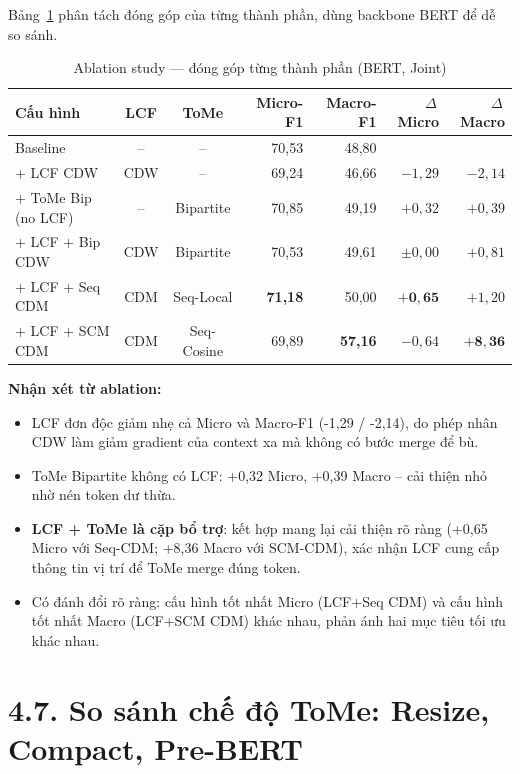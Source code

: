 Bảng~\ref{tab:ablation} phân tách đóng góp của từng thành phần,
dùng backbone BERT để dễ so sánh.

\begin{table}[H]
\centering
\small
\caption{Ablation study — đóng góp từng thành phần (BERT, Joint)}
\label{tab:ablation}
\begin{tabular}{@{}lccrrrr@{}}
\toprule
\textbf{Cấu hình} & \textbf{LCF} & \textbf{ToMe}
  & \textbf{Micro-F1} & \textbf{Macro-F1} & $\Delta$\,Micro & $\Delta$\,Macro \\
\midrule
Baseline             & --  & --        & 70,53 & 48,80 &       &       \\
+ LCF CDW            & CDW & --        & 69,24 & 46,66 & $-1,29$ & $-2,14$ \\
+ ToMe Bip (no LCF)  & --  & Bipartite & 70,85 & 49,19 & $+0,32$ & $+0,39$ \\
\midrule
+ LCF + Bip CDW      & CDW & Bipartite & 70,53 & 49,61 & $\pm0,00$ & $+0,81$ \\
+ LCF + Seq CDM      & CDM & Seq-Local & \textbf{71,18} & 50,00 & $\mathbf{+0,65}$ & $+1,20$ \\
+ LCF + SCM CDM      & CDM & Seq-Cosine & 69,89 & \textbf{57,16} & $-0,64$ & $\mathbf{+8,36}$ \\
\bottomrule
\end{tabular}
\end{table}

\textbf{Nhận xét từ ablation:}
\begin{itemize}
  \item LCF đơn độc giảm nhẹ cả Micro và Macro-F1 (-1,29 / -2,14),
        do phép nhân CDW làm giảm gradient của context xa mà không có
        bước merge để bù.
  \item ToMe Bipartite không có LCF: +0,32 Micro, +0,39 Macro -- cải
        thiện nhỏ nhờ nén token dư thừa.
  \item \textbf{LCF + ToMe là cặp bổ trợ}: kết hợp mang lại cải thiện
        rõ ràng (+0,65 Micro với Seq-CDM; +8,36 Macro với SCM-CDM),
        xác nhận LCF cung cấp thông tin vị trí để ToMe merge đúng token.
  \item Có đánh đổi rõ ràng: cấu hình tốt nhất Micro (LCF+Seq CDM)
        và cấu hình tốt nhất Macro (LCF+SCM CDM) khác nhau, phản ánh
        hai mục tiêu tối ưu khác nhau.
\end{itemize}

\section{4.7.\; So sánh chế độ ToMe: Resize, Compact, Pre-BERT}
\label{sec:resize_compact}

